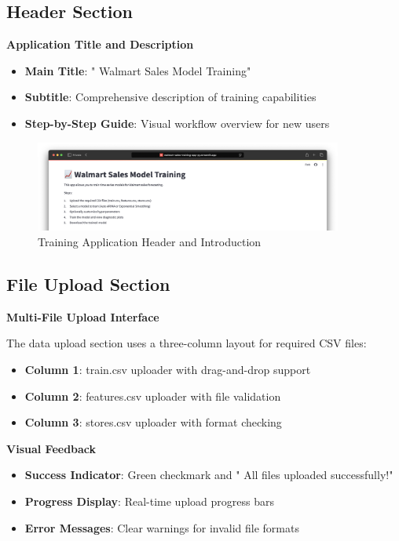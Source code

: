 \subsection{Header Section}

\textbf{Application Title and Description}
\begin{itemize}
    \item \textbf{Main Title}: " Walmart Sales Model Training"
    \item \textbf{Subtitle}: Comprehensive description of training capabilities
    \item \textbf{Step-by-Step Guide}: Visual workflow overview for new users
\end{itemize}

\begin{figure}[H]
    \centering
    \includegraphics[width=0.9\textwidth]{Images/04GUIAndUserInterface/TrainingHeader.png}
    \caption{Training Application Header and Introduction}
    \label{fig:training_header}
\end{figure}

\subsection{File Upload Section}

\textbf{Multi-File Upload Interface}

The data upload section uses a three-column layout for required CSV files:

\begin{itemize}
    \item \textbf{Column 1}: train.csv uploader with drag-and-drop support
    \item \textbf{Column 2}: features.csv uploader with file validation
    \item \textbf{Column 3}: stores.csv uploader with format checking
\end{itemize}

\textbf{Visual Feedback}
\begin{itemize}
    \item \textbf{Success Indicator}: Green checkmark and " All files uploaded successfully!"
    \item \textbf{Progress Display}: Real-time upload progress bars
    \item \textbf{Error Messages}: Clear warnings for invalid file formats
\end{itemize}

